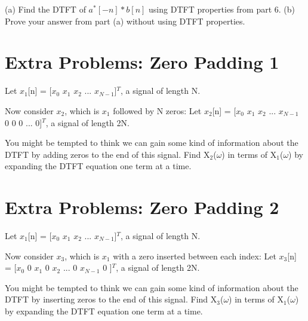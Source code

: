 \documentclass[11pt]{article}
\begin{document}
(a) Find the DTFT of $a^{*}[-n] * b[n]$ using DTFT properties from part 6.\newline
(b) Prove your answer from part (a) without using DTFT properties.



\section{Extra Problems: Zero Padding 1}

Let $x_1$[n] = [$x_0$ $x_1$ $x_2$ ... $x_{N-1}$]$^{T}$, a signal of length N.\newline

Now consider $x_2$, which is $x_1$ followed by N zeros: \newline
Let $x_2$[n] = [$x_0$ $x_1$ $x_2$ ... $x_{N-1}$ 0 0 0 ... 0]$^{T}$, a signal of length 2N.\newline

You might be tempted to think we can gain some kind of information about the DTFT by adding zeros to the end of this signal. Find X$_2$($\omega$) in terms of X$_1$($\omega$) by expanding the DTFT equation one term at a time.

\vspace{4mm}

\section{Extra Problems: Zero Padding 2}

Let $x_1$[n] = [$x_0$ $x_1$ $x_2$ ... $x_{N-1}$]$^{T}$, a signal of length N.\newline

Now consider $x_3$, which is $x_1$ with a zero inserted between each index: \newline
Let $x_3$[n] = [$x_0$ 0 $x_1$ 0 $x_2$ ... 0 $x_{N-1}$ 0 ]$^{T}$, a signal of length 2N.\newline

You might be tempted to think we can gain some kind of information about the DTFT by inserting zeros to the end of this signal. Find X$_3$($\omega$) in terms of X$_1$($\omega$) by expanding the DTFT equation one term at a time.
\end{document}
